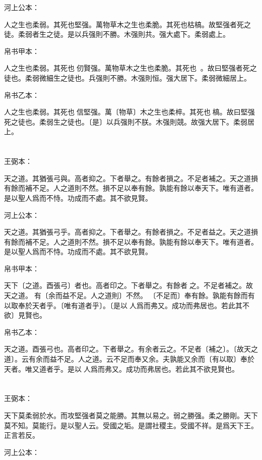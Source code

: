 \documentclass[a5paper]{ctexbook}
\begin{document}
    河上公本：

    人之生也柔弱。其死也堅强。萬物草木之生也柔脆。其死也枯槁。故堅强者死之徒。柔弱者生之徒。是以兵强則不勝。木强則共。强大處下。柔弱處上。

    帛书甲本：

    人之生也柔弱。其死也𦵕仞賢强。萬物草木之生也柔脆。其死也𣒞𩫓。故曰堅强者死之徒也。柔弱微細生之徒也。兵强則不勝。木强則恒。强大居下。柔弱微細居上。

    帛书乙本：

    人之生也柔弱。其死也󱁌信堅强。萬〔物草〕木之生也柔椊。其死也𣒞槁。故曰堅强死之徒也。柔弱生之徒也。〔是〕以兵强則不朕。木强則競。故强大居下。柔弱居上。

    \chapter{}
    王弼本：

    天之道。其猶張弓與。高者抑之。下者舉之。有餘者損之。不足者補之。天之道損有餘而補不足。人之道則不然。損不足以奉有餘。孰能有餘以奉天下。唯有道者。是以聖人爲而不恃。功成而不處。其不欲見賢。

    河上公本：

    天之道。其猶張弓乎。高者抑之。下者舉之。有餘者損之。不足者益之。天之道損有餘而補不足。人之道則不然。損不足以奉有餘。孰能有餘以奉天下。唯有道者。是以聖人爲而不恃。功成而不處。其不欲見賢。

    帛书甲本：

    天下〔之道。酉張弓〕者也。高者印之。下者舉之。有餘者𢿃之。不足者補之。故天之道。𢿃有〔余而益不足。人之道則〕不然。𢿃〔不足而〕奉有餘。孰能有餘而有以取奉於天者乎。〔唯有道者乎〕。〔是以𦔻人爲而弗又。成功而弗居也。若此其不欲〕見賢也。

    帛书乙本：

    天之道。酉張弓也。高者印之。下者舉之。有余者云之。不足者〔補之〕。〔故天之道〕。云有余而益不足。人之道。云不足而奉又余。夫孰能又余而〔有以取〕奉於天者。唯又道者乎。是以𦔻人爲而弗又。成功而弗居也。若此其不欲見賢也。

    \chapter{}
    王弼本：

    天下莫柔弱於水。而攻堅强者莫之能勝。其無以易之。弱之勝强。柔之勝剛。天下莫不知。莫能行。是以聖人云。受國之垢。是謂社稷主。受國不祥。是爲天下王。正言若反。

    河上公本：
\end{document}
